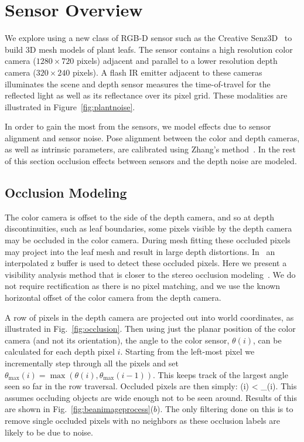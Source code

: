 \section{Sensor Overview}
\label{sec:overview}

We explore using a new class of RGB-D sensor such as the Creative Senz3D~\cite{nguyen2015vietnamese} to build 3D mesh models of plant leafs. The sensor contains a high resolution color camera ($1280 \times 720$ pixels) adjacent and parallel to a lower resolution depth camera ($320\times240$ pixels).  A flash IR emitter adjacent to these cameras illuminates the scene and depth sensor measures the time-of-travel for the reflected light as well as its reflectance over its pixel grid.  These modalities are illustrated in Figure~\ref{fig:plantnoise}.  

In order to gain the most from the sensors, we model effects due to sensor alignment and sensor noise.  Pose alignment between the color and depth cameras, as well as intrinsic parameters, are calibrated using Zhang's method~\cite{Zhang2000}.  In the rest of this section occlusion effects between sensors and the depth noise are modeled.


\subsection{Occlusion Modeling}

The color camera is offset to the side of the depth camera, and so at depth discontinuities, such as leaf boundaries, some pixels visible by the depth camera may be occluded in the color camera.  During mesh fitting these occluded pixels may project into the leaf mesh and result in large depth distortions.  In~\cite{Alenya2011} an interpolated z buffer is used to detect these occluded pixels.  Here we present a visibility analysis method that is closer to the stereo occlusion modeling~\cite{Belhumeur1996}.  We do not require rectification as there is no pixel matching, and we use the known horizontal offset of the color camera from the depth camera.

A row of pixels in the depth camera are projected out into world coordinates, as illustrated in Fig.~\ref{fig:occlusion}.  Then using just the planar position of the color camera (and not its orientation), the angle to the color sensor, $\theta(i)$, can be calculated for each depth pixel $i$.  Starting from the left-most pixel we incrementally step through all the pixels and set $\theta_{\max}(i) = \max(\theta(i),\theta_{\max}(i-1))$.  This keeps track of the largest angle seen so far in the row traversal.  Occluded pixels are then simply:
\beq
\theta(i) < \theta_{\max}(i). \label{eq:occluded}
\eeq
This assumes occluding objects are wide enough not to be seen around.  Results of this are shown in Fig.~\ref{fig:beanimageprocess}($b$).  The only filtering done on this is to remove single occluded pixels with no neighbors as these occlusion labels are likely to be due to noise.

